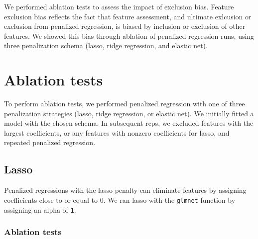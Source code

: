 \documentclass[]{article}
\newenvironment{Shaded}{\begin{snugshade}}{\end{snugshade}}
\newcommand{\CommentTok}[1]{\textcolor[rgb]{0.56,0.35,0.01}{\textit{#1}}}
\newcommand{\ControlFlowTok}[1]{\textcolor[rgb]{0.13,0.29,0.53}{\textbf{#1}}}
\newcommand{\DecValTok}[1]{\textcolor[rgb]{0.00,0.00,0.81}{#1}}
\newcommand{\KeywordTok}[1]{\textcolor[rgb]{0.13,0.29,0.53}{\textbf{#1}}}
\newcommand{\NormalTok}[1]{#1}
\newcommand{\OperatorTok}[1]{\textcolor[rgb]{0.81,0.36,0.00}{\textbf{#1}}}
\newcommand{\StringTok}[1]{\textcolor[rgb]{0.31,0.60,0.02}{#1}}
\begin{document}
\begin{Shaded}
\end{Shaded}

We performed ablation tests to assess the impact of exclusion bias.
Feature exclusion bias reflects the fact that feature assessment, and
ultimate exlcusion or exclusion from penalized regression, is biased by
inclusion or exclusion of other features. We showed this bias through
ablation of penalized regression runs, using three penalization schema
(lasso, ridge regression, and elastic net).

\hypertarget{ablation-tests}{%
\section{Ablation tests}\label{ablation-tests}}

To perform ablation tests, we performed penalized regression with one of
three penalization strategies (lasso, ridge regression, or elastic net).
We initially fitted a model with the chosen schema. In subsequent reps,
we excluded features with the largest coefficients, or any features with
nonzero coefficients for lasso, and repeated penalized regression.

\hypertarget{lasso}{%
\subsection{Lasso}\label{lasso}}

Penalized regressions with the lasso penalty can eliminate features by
assigning coefficients close to or equal to 0. We ran lasso with the
\texttt{glmnet} function by assigning an alpha of \texttt{1}.

\hypertarget{ablation-tests-1}{%
\subsubsection{Ablation tests}\label{ablation-tests-1}}
\end{document}
